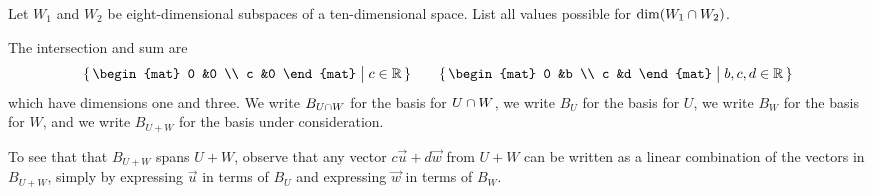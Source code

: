 \begin{exercises}
\begin{exparts}
      \partsitem Let \( W_1 \) and \( W_2 \) be eight-dimensional 
        subspaces of a ten-di\-men\-sion\-al space.
       List all values possible for \( \dim(W_1\cap W_2) \).
    \end{exparts}
    \begin{answer}
      \begin{exparts}
        \partsitem The intersection and sum are
          \begin{equation*}
             \set{\begin{mat}
                    0  &0  \\
                    c  &0
                  \end{mat} \suchthat c\in\Re  }
             \qquad
             \set{\begin{mat}
                    0  &b  \\
                    c  &d
                   \end{mat} \suchthat b,c,d\in\Re  }
          \end{equation*}
        which have dimensions one and three.
      \partsitem We write $B_{U\cap W}$ for the basis for 
        $U\cap W$,
        we write $B_U$ for the basis for $U$, 
        we write $B_W$ for the basis for $W$,
        and we write $B_{U+W}$ for the basis under consideration.

        To see that that $B_{U+W}$ spans $U+W$, observe that
        any vector $c\vec{u}+d\vec{w}$ from $U+W$ can be written as a linear
        combination of the vectors in $B_{U+W}$, 
        simply by expressing $\vec{u}$ in 
        terms of $B_U$ and expressing $\vec{w}$ in terms of $B_W$.


\end{exparts}
\end{answer}
\end{exercises}
